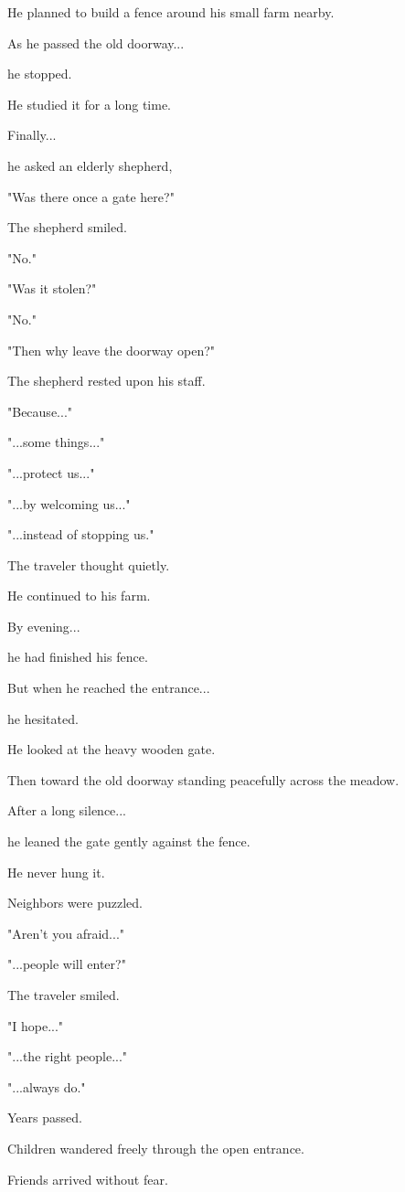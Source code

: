 \documentclass[12pt,openany]{book}
\begin{document}
He planned to build a fence around his small farm nearby.

As he passed the old doorway...

he stopped.

He studied it for a long time.

Finally...

he asked an elderly shepherd,

"Was there once a gate here?"

The shepherd smiled.

"No."

"Was it stolen?"

"No."

"Then why leave the doorway open?"

The shepherd rested upon his staff.

"Because..."

"...some things..."

"...protect us..."

"...by welcoming us..."

"...instead of stopping us."

The traveler thought quietly.

He continued to his farm.

By evening...

he had finished his fence.

But when he reached the entrance...

he hesitated.

He looked at the heavy wooden gate.

Then toward the old doorway standing peacefully across the meadow.

After a long silence...

he leaned the gate gently against the fence.

He never hung it.

Neighbors were puzzled.

"Aren't you afraid..."

"...people will enter?"

The traveler smiled.

"I hope..."

"...the right people..."

"...always do."

Years passed.

Children wandered freely through the open entrance.

Friends arrived without fear.
\end{document}
